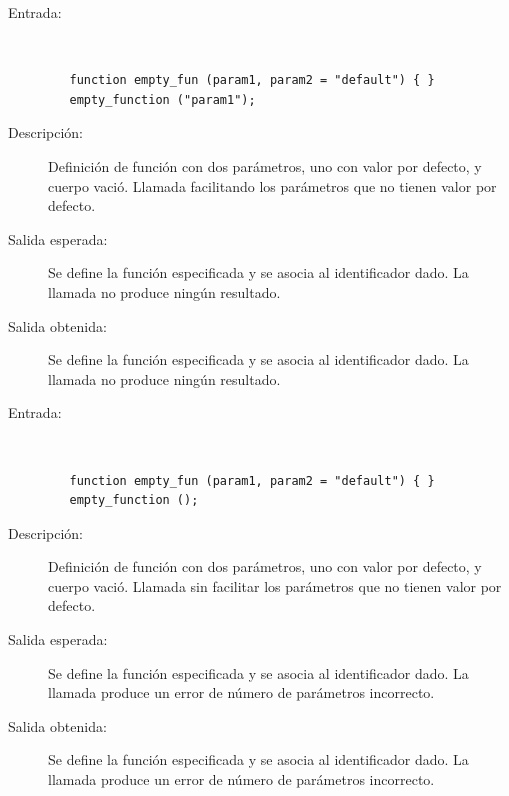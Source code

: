 \begin{framed}
	\begin{description}
		\item [Entrada:] \hfill \\
\begin{lstlisting}
   function empty_fun (param1, param2 = "default") { } 
   empty_function ("param1");
\end{lstlisting}
		\item [Descripción:] Definición de función con dos parámetros, uno con valor por defecto, y cuerpo vació. Llamada facilitando los parámetros que no tienen valor por defecto.
		\item [Salida esperada:] Se define la función especificada y se asocia al identificador dado. La llamada no produce ningún resultado.
		\item [Salida obtenida:] Se define la función especificada y se asocia al identificador dado. La llamada no produce ningún resultado.
	\end{description}
\end{framed}

\begin{framed}
	\begin{description}
		\item [Entrada:] \hfill \\
\begin{lstlisting}
   function empty_fun (param1, param2 = "default") { } 
   empty_function ();
\end{lstlisting}
		\item [Descripción:] Definición de función con dos parámetros, uno con valor por defecto, y cuerpo vació. Llamada sin facilitar los parámetros que no tienen valor por defecto.
		\item [Salida esperada:] Se define la función especificada y se asocia al identificador dado. La llamada produce un error de número de parámetros incorrecto.
		\item [Salida obtenida:] Se define la función especificada y se asocia al identificador dado. La llamada produce un error de número de parámetros incorrecto.
	\end{description}
\end{framed}

